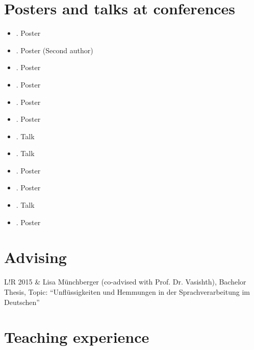 \documentclass[a4paper,11pt]{article}
\newcommand\VRule{\color{lightgray}\vrule width 0.5pt}
\begin{document}
  \section*{Posters and talks at conferences} 
  \begin{itemize}
    \item {}. Poster
    \item {}. Poster (Second author)
    \item {}. Poster
    \item {}. Poster
    \item {}. Poster
    \item  {}. Poster
    \item  {}. Talk
    \item  {}. Talk
    \item  {}. Poster
    \item  {}. Poster
    \item  {}. Talk 
    \item  {}. Poster 

  \end{itemize}

\section*{Advising}
\begin{tabular}{L!{\VRule}R}
2015  & Lisa Münchberger (co-advised with Prof. Dr. Vasishth), Bachelor Thesis, Topic: ``Unflüssigkeiten und Hemmungen in der Sprachverarbeitung im Deutschen'' \\[2pt]
\end{tabular} 
  
\section*{Teaching experience}
\end{document}
